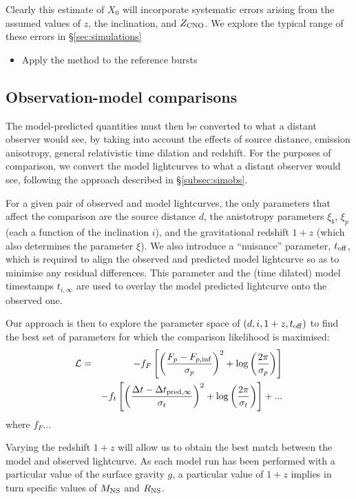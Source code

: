 \documentclass{aastex63}
\begin{document}
Clearly this estimate of $X_0$ will incorporate systematic errors arising from the assumed values of $z$, the inclination, and $Z_{\rm CNO}$. We explore the typical range of these errors in 
\S\ref{sec:simulations}

\begin{itemize}
\item Apply the method to the reference bursts
\end{itemize}

\subsection{Observation-model comparisons} 
\label{subsec:lccompare}

The model-predicted quantities must then be converted to what a distant observer would see, by taking into account the effects of source distance, emission anisotropy, general relativistic time dilation and redshift. For the purposes of comparison, we convert the model lightcurves to what a distant observer would see, following the approach described in \S\ref{subsec:simobs}.


For a given pair of observed and model lightcurves, the only parameters that affect the comparison are the source distance $d$, the anistotropy parameters $\xi_b$, $\xi_p$ (each a function of the inclination $i$), and the gravitational redshift $1+z$ (which also determines the parameter $\xi$).
%
We also introduce a ``nuisance'' parameter, $t_{\rm off}$, which is required to align the observed and predicted model lightcurve so as to minimise any residual differences. This parameter and the (time dilated) model timestamps $t_{i,\infty}$ are used to overlay the model predicted lightcurve onto the observed one.

Our approach is then to explore the parameter space of $(d, i, 1+z, t_{\rm off})$ to find the best set of parameters for which the comparison likelihood is maximised:
\begin{eqnarray}
\mathcal{L} & = & -f_F\left[\left( \frac{F_p-F_{p,\rm{inf}}}{\sigma_{p}}\right)^2 
    + \log\left(\frac{2\pi}{\sigma_p}\right)\right] \\
 & & -f_t\left[ \left( \frac{\Delta t-\Delta t_{{\rm pred},\infty}}{\sigma_t}\right)^2
    + \log\left(\frac{2\pi}{\sigma_t}\right)\right] + ...\\
\end{eqnarray}
where $f_F$...

Varying the redshift $1+z$ will allow us to obtain the best match between the model and observed lightcurve.
As each model run has been performed with a particular value of the surface gravity $g$, a particular value of $1+z$ implies in turn specific values of $M_{\rm NS}$ and $R_{\rm NS}$. 
\end{document}
